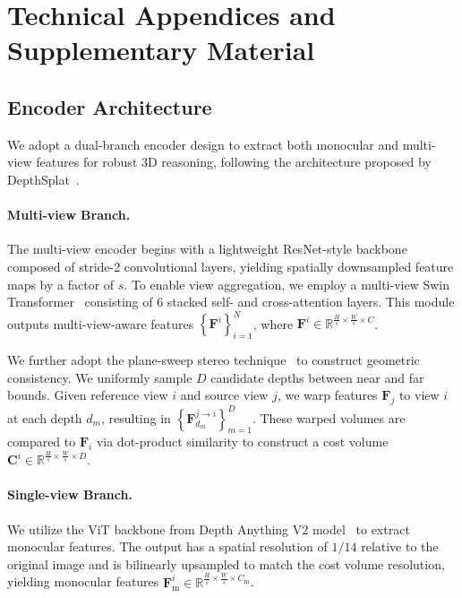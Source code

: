 \appendix

\section{Technical Appendices and Supplementary Material}
\subsection{Encoder Architecture}
\label{encoder}
We adopt a dual-branch encoder design to extract both monocular and multi-view features for robust 3D reasoning, following the architecture proposed by DepthSplat~\cite{xu2024depthsplat}.

\paragraph{Multi-view Branch.}
The multi-view encoder begins with a lightweight ResNet-style backbone composed of stride-2 convolutional layers, yielding spatially downsampled feature maps by a factor of \( s \). To enable view aggregation, we employ a multi-view Swin Transformer~\cite{liu2021swin} consisting of 6 stacked self- and cross-attention layers. This module outputs multi-view-aware features \(\left\{\boldsymbol{F}^i\right\}_{i=1}^N\), where \(\boldsymbol{F}^i \in \mathbb{R}^{\frac{H}{s} \times \frac{W}{s} \times C}\).

We further adopt the plane-sweep stereo technique~\cite{collins1996space,xu2023unifying} to construct geometric consistency. We uniformly sample \( D \) candidate depths between near and far bounds. Given reference view \( i \) and source view \( j \), we warp features \(\boldsymbol{F}_j\) to view \( i \) at each depth \( d_m \), resulting in \(\left\{\boldsymbol{F}_{d_m}^{j \rightarrow i}\right\}_{m=1}^D\). These warped volumes are compared to \(\boldsymbol{F}_i\) via dot-product similarity to construct a cost volume \(\boldsymbol{C}^i \in \mathbb{R}^{\frac{H}{s} \times \frac{W}{s} \times D}\).

\paragraph{Single-view Branch.}
We utilize the ViT backbone from Depth Anything V2 model~\cite{yang2024depth} to extract monocular features. The output has a spatial resolution of \(1/14\) relative to the original image and is bilinearly upsampled to match the cost volume resolution, yielding monocular features \(\boldsymbol{F}_{\text{m}}^i \in \mathbb{R}^{\frac{H}{s} \times \frac{W}{s} \times C_\text{m}}\).

